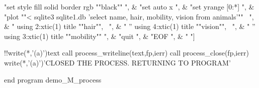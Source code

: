 \begin{DoxyVerb}
"set style fill solid border rgb ""black""                                             ", &
"set auto x                                                                            ", &
"set yrange [0:*]                                                                      ", &
"plot ""< sqlite3 sqlite1.db  'select name, hair, mobility, vision  from animals'"" \  ", &
"      using 2:xtic(1) title ""hair"",  \                                              ", &
"   '' using 4:xtic(1) title ""vision"", \                                             ", &
"   '' using 3:xtic(1) title ""mobility""                                              ", &
"quit                                                                                  ", &
"EOF                                                                                   ", &
" "]

   !!write(*,'(a)')text
   call process_writeline(text,fp,ierr)
   call process_close(fp,ierr)
   write(*,'(a)')'CLOSED THE PROCESS. RETURNING TO PROGRAM'

end program demo_M_process
\end{DoxyVerb}


